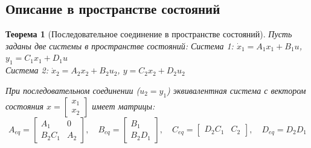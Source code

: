 \documentclass[12pt,a4paper]{article}
\newtheorem{theorem}{Теорема}
\begin{document}
\subsection{Описание в пространстве состояний}

\begin{theorem}[Последовательное соединение в пространстве состояний]
    Пусть заданы две системы в пространстве состояний:
    Система 1: $\dot{x}_1 = A_1 x_1 + B_1 u$, \quad $y_1 = C_1 x_1 + D_1 u$ \\
    Система 2: $\dot{x}_2 = A_2 x_2 + B_2 u_2$, \quad $y = C_2 x_2 + D_2 u_2$

    При последовательном соединении ($u_2 = y_1$) эквивалентная система с вектором состояния $x = \begin{bmatrix} x_1 \\ x_2 \end{bmatrix}$ имеет матрицы:
    \begin{equation}
        A_{eq} = \begin{bmatrix} A_1 & 0 \\ B_2 C_1 & A_2 \end{bmatrix}, \quad
        B_{eq} = \begin{bmatrix} B_1 \\ B_2 D_1 \end{bmatrix}, \quad
        C_{eq} = \begin{bmatrix} D_2 C_1 & C_2 \end{bmatrix}, \quad
        D_{eq} = D_2 D_1
    \end{equation}
\end{theorem}
\end{document}
